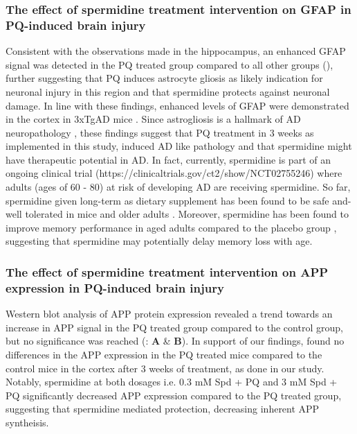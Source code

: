 \subsubsection{The effect of spermidine treatment intervention on GFAP in PQ-induced brain injury}
Consistent with the observations made in the hippocampus, an enhanced GFAP signal was detected in the PQ treated group compared to all other groups (), further suggesting that PQ induces astrocyte gliosis as likely indication for neuronal injury in this region and that spermidine protects against neuronal damage. In line with these findings, enhanced levels of GFAP were demonstrated in the cortex in 3xTgAD mice \citep{Kamphuis2014,Oddo2003}. Since astrogliosis is a hallmark of AD neuropathology \citep{Gotz2001,Grundke-Iqbal1989}, these findings suggest that PQ treatment in 3 weeks as implemented in this study, induced AD like pathology and that spermidine might have therapeutic potential in AD. In fact, currently, spermidine is part of an ongoing clinical trial (https://clinicaltrials.gov/ct2/show/NCT02755246) where adults (ages of 60 - 80) at risk of developing AD are receiving spermidine. So far, spermidine given long-term as dietary supplement has been found to be safe and-well tolerated in mice and older adults \citep{Schwarz2018}. Moreover, spermidine has been found to improve memory performance in aged adults compared to the placebo group \citep{Wirth2018}, suggesting that spermidine may potentially delay memory loss with age.

\subsubsection{The effect of spermidine treatment intervention on APP expression in PQ-induced brain injury}
Western blot analysis of APP protein expression revealed a trend towards an increase in APP signal in the PQ treated group compared to the control group, but no significance was reached  (: \textbf{A} \& \textbf{B}). In support of our findings, \citet{Chen2012} found no differences in the APP expression in the PQ treated mice compared to the control mice in the cortex after 3 weeks of treatment, as done in our study. Notably, spermidine at both dosages i.e. 0.3 mM Spd + PQ and 3 mM Spd + PQ significantly decreased APP expression compared to the PQ treated group, suggesting that spermidine mediated protection, decreasing inherent APP syntheisis. 

